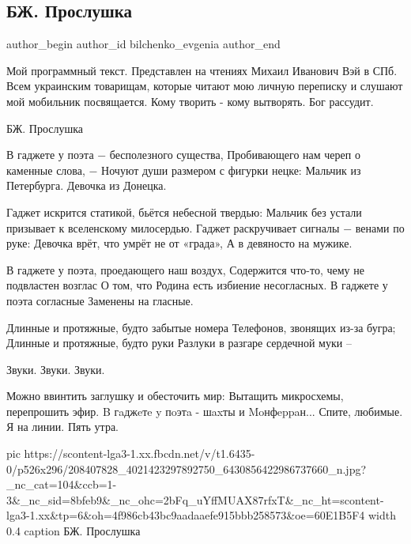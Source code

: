  
 
 
 
 
 
\subsection{БЖ. Прослушка}
\label{sec:30_06_2021.fb.bilchenko_evgenia.3.proslushka}
\ifcmt
 author_begin
   author_id bilchenko_evgenia
 author_end
\fi

Мой программный текст. Представлен на чтениях Михаил Иванович Вэй в СПб. Всем
украинским товарищам, которые читают мою личную переписку и слушают мой
мобильник посвящается. Кому творить - кому вытворять. Бог рассудит.

БЖ. Прослушка

В гаджете у поэта − бесполезного существа,
Пробивающего нам череп о каменные слова, −
Ночуют души размером с фигурки нецке:
Мальчик из Петербурга.
Девочка из Донецка.

Гаджет искрится статикой, бьётся небесной твердью:
Мальчик без устали призывает к вселенскому милосердью.
Гаджет раскручивает сигналы − венами по руке:
Девочка врёт, что умрёт не от «града»,
А в девяносто на мужике.

В гаджете у поэта, проедающего наш воздух,
Содержится что-то, чему не подвластен возглас
О том, что Родина есть избиение несогласных.
В гаджете у поэта согласные
Заменены на гласные.

Длинные и протяжные, будто забытые номера
Телефонов, звонящих из-за бугра;
Длинные и протяжные, будто руки
Разлуки в разгаре сердечной муки –

Звуки.
Звуки.
Звуки.

Можно ввинтить заглушку и обесточить мир:
Вытащить микросхемы, перепрошить эфир.
B гaджeтe y пoэтa - шaxты и Moнфeppaн...
Спите, любимые.
Я на линии.
Пять утра.

\ifcmt
  pic https://scontent-lga3-1.xx.fbcdn.net/v/t1.6435-0/p526x296/208407828_4021423297892750_6430856422986737660_n.jpg?_nc_cat=104&ccb=1-3&_nc_sid=8bfeb9&_nc_ohc=2bFq_uYffMUAX87rfxT&_nc_ht=scontent-lga3-1.xx&tp=6&oh=4f986cb43bc9aadaaefe915bbb258573&oe=60E1B5F4
  width 0.4
  caption БЖ. Прослушка
\fi
